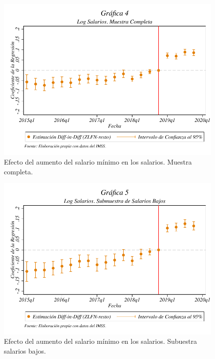 \begin{figure}[H]
\includegraphics[width=\textwidth]{Figures/_LogSalarios_MuestraCompleta.pdf}
\caption{Efecto del aumento del salario mínimo en los salarios. Muestra completa.}
\label{fig:4}
\end{figure}

\begin{figure}[H]
\includegraphics[width=\textwidth]{Figures/_LogSalarios_SalariosBajos.pdf}\caption{Efecto del aumento del salario mínimo en los salarios. Subuestra salarios bajos.}
\label{fig:5}
\end{figure}

